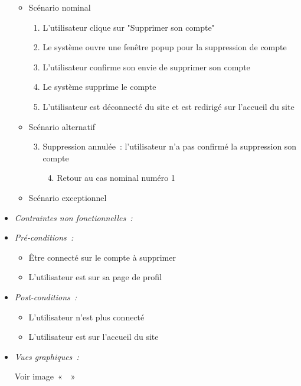 \begin{itemize}
    \begin{itemize}
        \item Scénario nominal
        \begin{enumerate}
            \item L'utilisateur clique sur "Supprimer son compte"
            \item Le système ouvre une fenêtre popup pour la suppression de compte
            \item L'utilisateur confirme son envie de supprimer son compte
            \item Le système supprime le compte
            \item L'utilisateur est déconnecté du site et est redirigé sur l'accueil du site
        \end{enumerate}
        \item Scénario alternatif
        \begin{enumerate}[{1{a}.}]\setcounter{enumi}{2}
            \item Suppression annulée~: l'utilisateur n'a pas confirmé la suppression son compte
                \begin{enumerate}[{1.}]\setcounter{enumii}{3}
                    \item Retour au cas nominal numéro 1
                \end{enumerate}
        \end{enumerate}
        \item Scénario exceptionnel
    \end{itemize}

\item \textit{Contraintes non fonctionnelles~:}

\item \textit{Pré-conditions~:}

    \begin{itemize}
        \item Être connecté sur le compte à supprimer
        \item L'utilisateur est sur sa page de profil
    \end{itemize}

\item \textit{Post-conditions~:}

    \begin{itemize}
        \item L'utilisateur n'est plus connecté
        \item L'utilisateur est sur l'accueil du site
    \end{itemize}

\item \textit{Vues graphiques~:}

Voir image~«~~»

\end{itemize}

